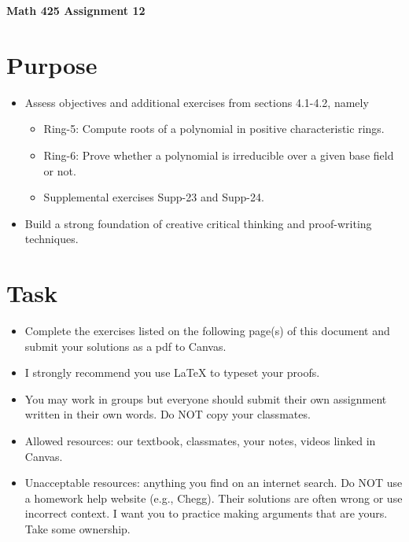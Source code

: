 \documentclass[12pt]{article}
\begin{document}
	\begin{center}
		{\Large \bf Math 425 Assignment 12}
	\end{center}
	\section*{Purpose}
	\begin{itemize}
		\item Assess objectives and additional exercises from sections 4.1-4.2, namely
		\begin{itemize} 
			\item Ring-5: Compute roots of a polynomial in positive characteristic rings.
			\item Ring-6:	Prove whether a polynomial is irreducible over a given base field or not.
			\item Supplemental exercises Supp-23 and Supp-24.
		\end{itemize}
		\item Build a strong foundation of creative critical thinking and proof-writing techniques.
	\end{itemize}
	\section*{Task}
	\begin{itemize}
		\item Complete the exercises listed on the following page(s) of this document and submit your solutions as a pdf to Canvas.
		\item I strongly recommend you use LaTeX to typeset your proofs.
		\item You may work in groups but everyone should submit their own assignment written in their own words.  Do NOT copy your classmates.
		\item Allowed resources: our textbook, classmates, your notes, videos linked in Canvas.
		\item Unacceptable resources: anything you find on an internet search. Do NOT use a homework help website (e.g., Chegg). Their solutions are often wrong or use incorrect context.  I want you to practice making arguments that are yours. Take some ownership.
	\end{itemize}
\end{document}
